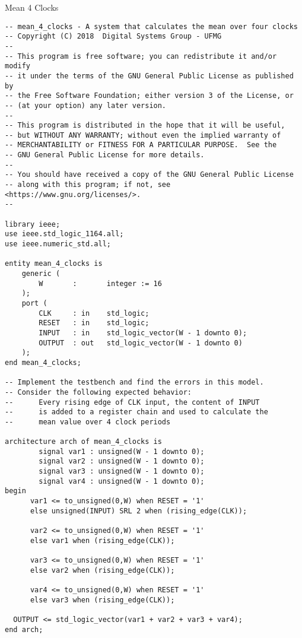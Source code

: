\documentclass[12pt]{article}
\begin{document}
\Large

\begin{center}
Mean 4 Clocks
\end{center}

\normalsize

\begin{verbatim}
-- mean_4_clocks - A system that calculates the mean over four clocks
-- Copyright (C) 2018  Digital Systems Group - UFMG
--
-- This program is free software; you can redistribute it and/or modify
-- it under the terms of the GNU General Public License as published by
-- the Free Software Foundation; either version 3 of the License, or
-- (at your option) any later version.
--
-- This program is distributed in the hope that it will be useful,
-- but WITHOUT ANY WARRANTY; without even the implied warranty of
-- MERCHANTABILITY or FITNESS FOR A PARTICULAR PURPOSE.  See the
-- GNU General Public License for more details.
--
-- You should have received a copy of the GNU General Public License
-- along with this program; if not, see <https://www.gnu.org/licenses/>.
--

library ieee;
use ieee.std_logic_1164.all;
use ieee.numeric_std.all;

entity mean_4_clocks is
    generic (
        W       :       integer := 16
    );
    port (
        CLK     : in    std_logic;
        RESET   : in    std_logic;
        INPUT   : in    std_logic_vector(W - 1 downto 0);
        OUTPUT  : out   std_logic_vector(W - 1 downto 0)
    );
end mean_4_clocks;

-- Implement the testbench and find the errors in this model.
-- Consider the following expected behavior:
--      Every rising edge of CLK input, the content of INPUT
--      is added to a register chain and used to calculate the
--      mean value over 4 clock periods

architecture arch of mean_4_clocks is
        signal var1 : unsigned(W - 1 downto 0);
        signal var2 : unsigned(W - 1 downto 0);
        signal var3 : unsigned(W - 1 downto 0);
        signal var4 : unsigned(W - 1 downto 0);
begin
	  var1 <= to_unsigned(0,W) when RESET = '1'
	  else unsigned(INPUT) SRL 2 when (rising_edge(CLK));

	  var2 <= to_unsigned(0,W) when RESET = '1'
	  else var1 when (rising_edge(CLK));

	  var3 <= to_unsigned(0,W) when RESET = '1'
	  else var2 when (rising_edge(CLK));

	  var4 <= to_unsigned(0,W) when RESET = '1'
	  else var3 when (rising_edge(CLK));

  OUTPUT <= std_logic_vector(var1 + var2 + var3 + var4);
end arch;
\end{verbatim}
\end{document}
